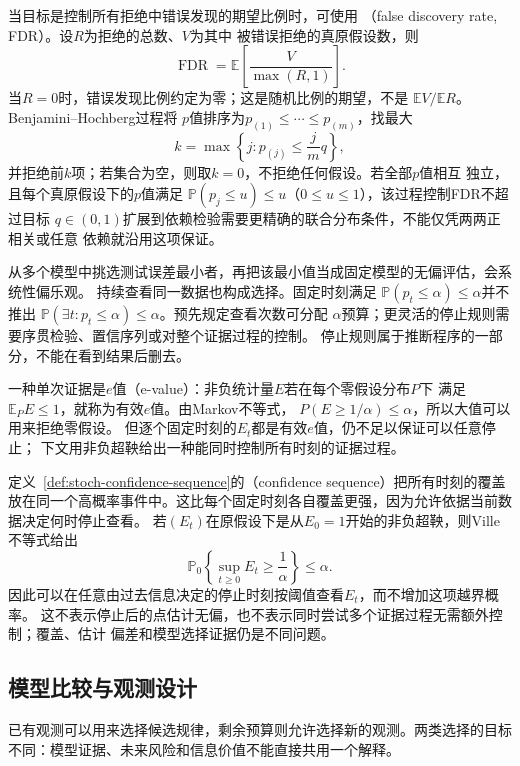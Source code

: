当目标是控制所有拒绝中错误发现的期望比例时，可使用
（false discovery rate, FDR）。设\(R\)为拒绝的总数、\(V\)为其中
被错误拒绝的真原假设数，则
\[
  \operatorname{FDR}=\mathbb E\left[\frac{V}{\max(R,1)}\right].
\]
当\(R=0\)时，错误发现比例约定为零；这是随机比例的期望，不是
\(\mathbb EV/\mathbb ER\)。Benjamini--Hochberg过程将
\(p\)值排序为\(p_{(1)}\leq\cdots\leq p_{(m)}\)，找最大
\[
  k=\max\left\{j:p_{(j)}\leq\frac{j}{m}q\right\},
\]
并拒绝前\(k\)项；若集合为空，则取\(k=0\)，不拒绝任何假设。若全部\(p\)值相互
独立，且每个真原假设下的\(p\)值满足
\(\mathbb P(p_j\leq u)\leq u\)（\(0\leq u\leq1\)），该过程控制FDR不超过目标
\(q\in(0,1)\)扩展到依赖检验需要更精确的联合分布条件，不能仅凭两两正相关或任意
依赖就沿用这项保证。

从多个模型中挑选测试误差最小者，再把该最小值当成固定模型的无偏评估，会系统性偏乐观。
持续查看同一数据也构成选择。固定时刻满足
\(\mathbb{P}(p_t\leq\alpha)\leq\alpha\)并不推出
\(\mathbb{P}(\exists t:p_t\leq\alpha)\leq\alpha\)。预先规定查看次数可分配
\(\alpha\)预算；更灵活的停止规则需要序贯检验、置信序列或对整个证据过程的控制。
停止规则属于推断程序的一部分，不能在看到结果后删去。

一种单次证据是\(e\)值（e-value）：非负统计量\(E\)若在每个零假设分布\(P\)下
满足\(\mathbb E_PE\leq1\)，就称为有效\(e\)值。由Markov不等式，
\(P(E\geq1/\alpha)\leq\alpha\)，所以大值可以用来拒绝零假设。
但逐个固定时刻的\(E_t\)都是有效\(e\)值，仍不足以保证可以任意停止；
下文用非负超鞅给出一种能同时控制所有时刻的证据过程。

定义~\ref{def:stoch-confidence-sequence}的（confidence sequence）把所有时刻的覆盖放在同一个高概率事件中。这比每个固定时刻各自覆盖更强，因为允许依据当前数据决定何时停止查看。
若\((E_t)\)在原假设下是从\(E_0=1\)开始的非负超鞅，则Ville不等式给出
\[
  \mathbb{P}_0\left\{\sup_{t\geq0}E_t\geq\frac1\alpha\right\}\leq\alpha.
\]
因此可以在任意由过去信息决定的停止时刻按阈值查看\(E_t\)，而不增加这项越界概率。
这不表示停止后的点估计无偏，也不表示同时尝试多个证据过程无需额外控制；覆盖、估计
偏差和模型选择证据仍是不同问题。

\subsection{模型比较与观测设计}
\label{sec:stats-model-comparison-data-acquisition}
已有观测可以用来选择候选规律，剩余预算则允许选择新的观测。两类选择的目标不同：模型证据、未来风险和信息价值不能直接共用一个解释。

